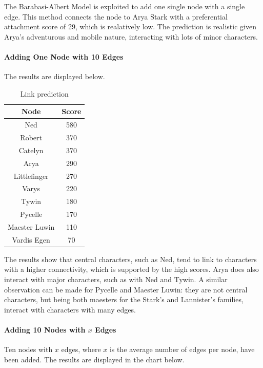 \documentclass[10pt,twocolumn,letterpaper]{article}
\begin{document}
The Barabasi-Albert Model is exploited to add one single node with a single edge. This method connects the node to Arya Stark with a preferential attachment score of 29, which is realatively low. The prediction is realistic given Arya's adventurous and mobile nature, interacting with lots of minor characters.

\paragraph{Adding One Node with 10 Edges}

The results are displayed below.

\begin{table}[!h]
    \centering
    \small
    \begin{tabular}{c|c} 
    Node & Score \\
    \hline
    Ned	& 580 \\
    Robert	& 370\\
    Catelyn	& 370\\
    Arya & 290\\
    Littlefinger &  270\\
    Varys & 220\\
    Tywin  &180\\
    Pycelle & 170\\
    Maester Luwin & 110\\
    Vardis Egen &	70\\
    \hline 
    \end{tabular} 
    \vspace{0.2cm}
    \caption{Link prediction}
    \label{tab:my_label}
\end{table}

The results show that central characters, such as Ned, tend to link to characters with a higher connectivity, which is supported by the high scores. Arya does also interact with major characters, such as with Ned and Tywin. A similar observation can be made for Pycelle and Maester Luwin: they are not central characters, but being both maesters for the Stark's and Lannister's families, interact with characters with many edges.

\paragraph{Adding 10 Nodes with $x$ Edges}
Ten nodes with $x$ edges, where $x$ is the average number of edges per node, have been added. The results are displayed in the chart below.
\end{document}

